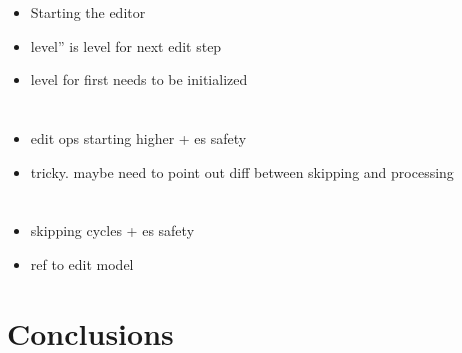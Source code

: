 \begin{itemize}
\item Starting the editor
\item level'' is level for next edit step
\item level for first needs to be initialized
\end{itemize}



%																
%																
%																
\section{}
\begin{itemize}
\item edit ops starting higher + es safety
\item tricky. maybe need to point out diff between skipping and processing
\end{itemize}

\section{}
\begin{itemize}
\item skipping cycles + es safety
\item ref to edit model
\end{itemize}

\section{Conclusions}







